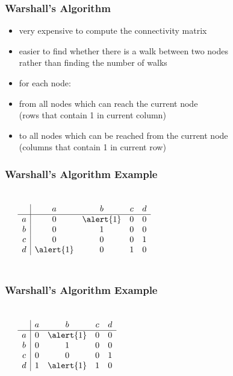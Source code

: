 \documentclass[dvipsnames]{beamer}
\begin{document}
\begin{frame}
  \frametitle{Warshall's Algorithm}

  \begin{itemize}
    \item very expensive to compute the connectivity matrix
    \item easier to find whether there is a walk between two nodes\\
      rather than finding the number of walks

    \pause
    \bigskip
    \item for each node:
    \smallskip
    \item from all nodes which can reach the current node\\
      (rows that contain 1 in current column)

    \item to all nodes which can be reached from the current node\\
      (columns that contain 1 in current row)
  \end{itemize}
\end{frame}

\begin{frame}
  \frametitle{Warshall's Algorithm Example}

  \begin{columns}
    \begin{center}
    \end{center}

    \[
      \begin{array}{c|cccc}
            & a & b & c & d\\\hline
          a & 0 & \alert{1} & 0 & 0\\
          b & 0 & 1 & 0 & 0\\
          c & 0 & 0 & 0 & 1\\
          d & \alert{1} & 0 & 1 & 0
      \end{array}
    \]
  \end{columns}
\end{frame}

\begin{frame}
  \frametitle{Warshall's Algorithm Example}

  \begin{columns}
    \begin{center}
    \end{center}

    \[
      \begin{array}{c|cccc}
            & a & b & c & d\\\hline
          a & 0 & \alert{1} & 0 & 0\\
          b & 0 & 1 & 0 & 0\\
          c & 0 & 0 & 0 & 1\\
          d & 1 & \alert{1} & 1 & 0
      \end{array}
    \]
  \end{columns}
\end{frame}
\end{document}
